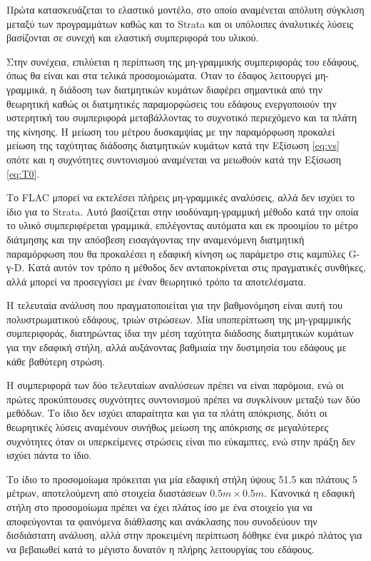 Πρώτα κατασκευάζεται το ελαστικό μοντέλο, στο οποίο αναμένεται απόλυτη σύγκλιση μεταξύ των προγραμμάτων καθώς και το Strata και οι υπόλοιπες άναλυτικές λύσεις βασίζονται σε συνεχή και ελαστική συμπεριφορά του υλικού.

Στην συνέχεια, επιλύεται η περίπτωση της μη-γραμμικής συμπεριφοράς του εδάφους, όπως θα είναι και στα τελικά προσομοιώματα. Όταν το έδαφος λειτουργεί μη-γραμμικά, η διάδοση των διατμητικών κυμάτων διαφέρει σημαντικά από την θεωρητική καθώς οι διατμητικές παραμορφώσεις του εδάφους ενεργοποιούν την υστερητική του συμπεριφορά μεταβάλλοντας το συχνοτικό περιεχόμενο και τα πλάτη της κίνησης. Η μείωση του μέτρου δυσκαμψίας με την παραμόρφωση προκαλεί μείωση της ταχύτητας διάδοσης διατμητικών κυμάτων κατά την Εξίσωση \ref{eq:vs} οπότε και η συχνότητες συντονισμού αναμένεται να μειωθούν κατά την Εξίσωση \ref{eq:T0}.

Το FLAC μπορεί να εκτελέσει πλήρεις μη-γραμμικές αναλύσεις, αλλά δεν ισχύει το ίδιο για το Strata. Αυτό βασίζεται στην ισοδύναμη-γραμμική μέθοδο κατά την οποία το υλικό συμπεριφέρεται γραμμικά, επιλέγοντας αυτόματα και εκ προοιμίου το μέτρο διάτμησης και την απόσβεση εισαγάγοντας την αναμενόμενη διατμητική παραμόρφωση που θα προκαλέσει η εδαφική κίνηση ως παράμετρο στις καμπύλες G-γ-D. Κατά αυτόν τον τρόπο η μέθοδος δεν ανταποκρίνεται στις πραγματικές συνθήκες, αλλά μπορεί να προσεγγίσει με έναν θεωρητικό τρόπο τα αποτελέσματα.

Η τελευταία ανάλυση που πραγματοποιείται για την βαθμονόμηση είναι αυτή του πολυστρωματικού εδάφους, τριών στρώσεων. Μία υποπερίπτωση της μη-γραμμικής συμπεριφοράς, διατηρώντας ίδια την μέση ταχύτητα διάδοσης διατμητικών κυμάτων για την εδαφική στήλη, αλλά αυξάνοντας βαθμιαία την δυστμησία του εδάφους με κάθε βαθύτερη στρώση.

Η συμπεριφορά των δύο τελευταίων αναλύσεων πρέπει να είναι παρόμοια, ενώ οι πρώτες προκύπτουσες συχνότητες συντονισμού πρέπει να συγκλίνουν μεταξύ των δύο μεθόδων. Το ίδιο δεν ισχύει απαραίτητα και για τα πλάτη απόκρισης, διότι οι θεωρητικές λύσεις αναμένουν συνήθως μείωση της απόκρισης σε μεγαλύτερες συχνότητες όταν οι υπερκείμενες στρώσεις είναι πιο εύκαμπτες, ενώ στην πράξη δεν ισχύει πάντα το ίδιο.

Το ίδιο το προσομοίωμα πρόκειται για μία εδαφική στήλη ύψους 51.5 και πλάτους 5 μέτρων, αποτελούμενη από στοιχεία διαστάσεων $0.5m\times 0.5m$. Κανονικά η εδαφική στήλη στο προσομοίωμα πρέπει να έχει πλάτος ίσο με ένα στοιχείο για να αποφεύγονται τα φαινόμενα διάθλασης και ανάκλασης που συνοδεύουν την δισδιάστατη ανάλυση, αλλά στην προκειμένη περίπτωση δόθηκε ένα μικρό πλάτος για να βεβαιωθεί κατά το μέγιστο δυνατόν η πλήρης λειτουργίας του εδάφους.

